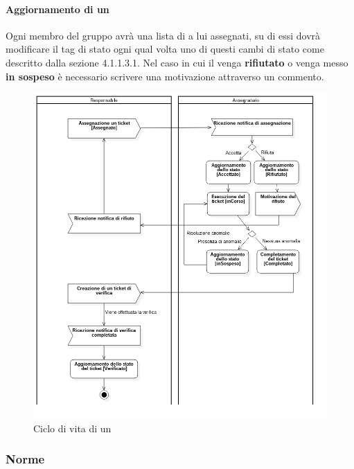 	\paragraph{Aggiornamento di un }
	\label{sec:4.1.2.2}
		Ogni membro del gruppo avrà una lista di  a lui assegnati, su di essi dovrà modificare il tag di stato ogni qual volta uno di questi cambi di stato come descritto dalla sezione 4.1.1.3.1. Nel caso in cui il  venga \textbf{rifiutato} o venga messo \textbf{in sospeso} è necessario scrivere una motivazione attraverso un commento.
		\begin{figure}
			\includegraphics[scale=.53]{img/vitaTicket.png}
			\centering
			\caption{Ciclo di vita di un }
		\end{figure}
\subsubsection{Norme}
\label{sec:4.1.3}
